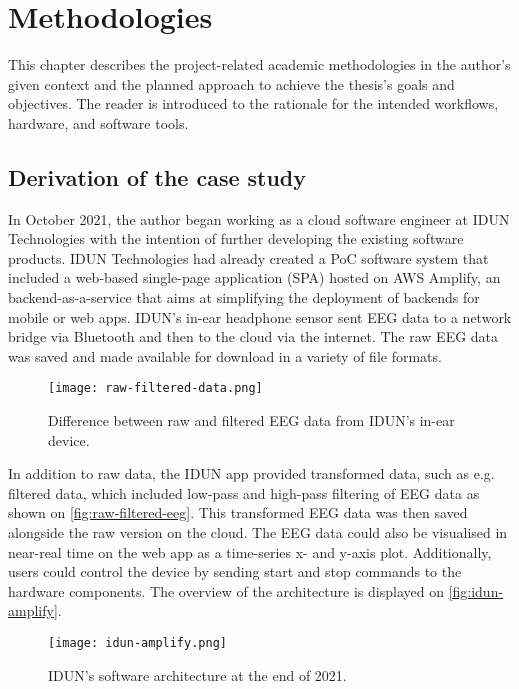 \chapter{Methodologies}
\graphicspath{{Chapter3/Figs/}{Chapter3/Figs/}}

This chapter describes the project-related academic methodologies in the author's given context and the planned approach to achieve the thesis's goals and objectives. The reader is introduced to the rationale for the intended workflows, hardware, and software tools.

\section{Derivation of the case study}
\label{chapter3-derivation-of-the-case-study}

In October 2021, the author began working as a cloud software engineer at IDUN Technologies with the intention of further developing the existing software products. IDUN Technologies had already created a PoC software system that included a web-based single-page application (SPA) hosted on AWS Amplify, an backend-as-a-service that aims at simplifying the deployment of backends for mobile or web apps. IDUN's in-ear headphone sensor sent EEG data to a network bridge via Bluetooth and then to the cloud via the internet. The raw EEG data was saved and made available for download in a variety of file formats.

\begin{figure}[!ht]
  \centering
  \texttt{[image: raw-filtered-data.png]}
  \caption{Difference between raw and filtered EEG data from IDUN's in-ear device.}
  \label{fig:raw-filtered-eeg}
\end{figure}

In addition to raw data, the IDUN app provided transformed data, such as e.g. filtered data, which included low-pass and high-pass filtering of EEG data as shown on \autoref{fig:raw-filtered-eeg}. This transformed EEG data was then saved alongside the raw version on the cloud. The EEG data could also be visualised in near-real time on the web app as a time-series x- and y-axis plot. Additionally, users could control the device by sending start and stop commands to the hardware components. The overview of the architecture is displayed on \autoref{fig:idun-amplify}.

\begin{figure}[!ht]
  \centering
  \texttt{[image: idun-amplify.png]}
  \caption{IDUN's software architecture at the end of 2021.}
  \label{fig:idun-amplify}
\end{figure}

